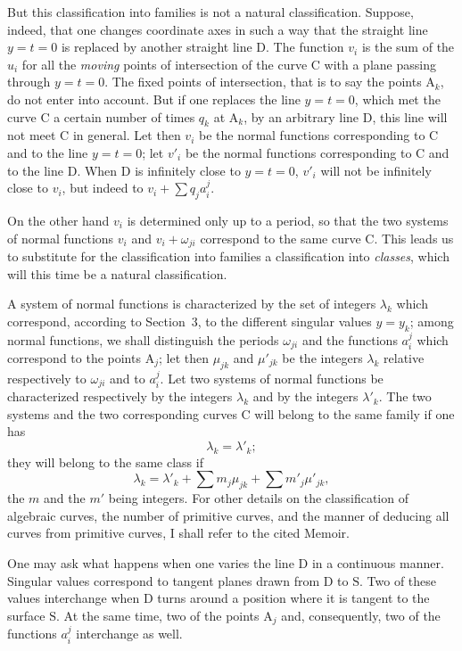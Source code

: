 \documentclass{article}
\begin{document}
But this classification into families is not a natural classification. Suppose, indeed, that one changes coordinate axes in such a way that the straight line $y = t = 0$ is replaced by another straight line $\mathrm{D}$. The function $v_{i}$ is the sum of the $u_{i}$ for all the \emph{moving} points of intersection of the curve $\mathrm{C}$ with a plane passing through $y = t = 0$. The fixed points of intersection, that is to say the points $\mathrm{A}_{k}$, do not enter into account. But if one replaces the line $y = t = 0$, which met the curve $\mathrm{C}$ a certain number of times $q_{k}$ at $\mathrm{A}_{k}$, by an arbitrary line $\mathrm{D}$, this line will not meet $\mathrm{C}$ in general. Let then $v_{i}$ be the normal functions corresponding to $\mathrm{C}$ and to the line $y = t = 0$;
let $v'_{i}$ be the normal functions corresponding to $\mathrm{C}$ and to the line $\mathrm{D}$. When $\mathrm{D}$ is infinitely close to $y = t = 0$, $v'_{i}$ will not be infinitely close to $v_{i}$, but indeed to $\displaystyle v_{i} + \sum q_{j} a_{i}^{j}$.

On the other hand $v_{i}$ is determined only up to a period, so that the two systems of normal functions $v_{i}$ and $v_{i} + \omega_{ji}$ correspond to the same curve $\mathrm{C}$. This leads us to substitute for the classification into families a classification into \emph{classes}, which will this time be a natural classification.

A system of normal functions is characterized by the set of integers $\lambda_{k}$ which correspond, according to Section~3, to the different singular values $y = y_{k}$; among normal functions, we shall distinguish the periods $\omega_{ji}$ and the functions $a_{i}^{j}$ which correspond to the points $\mathrm{A}_{j}$; let then $\mu_{jk}$ and $\mu'_{jk}$ be the integers $\lambda_{k}$ relative respectively to $\omega_{ji}$ and to $a_{i}^{j}$. Let two systems of normal functions be characterized respectively by the integers $\lambda_{k}$ and by the integers $\lambda'_{k}$. The two systems and the two corresponding curves $\mathrm{C}$ will belong to the same family if one has
\[
\lambda_{k} = \lambda'_{k};
\]
they will belong to the same class if
\[
\lambda_{k} = \lambda'_{k} + \sum m_{j} \mu_{jk} + \sum m'_{j} \mu'_{jk},
\]
the $m$ and the $m'$ being integers. For other details on the classification of algebraic curves, the number of primitive curves, and the manner of deducing all curves from primitive curves, I shall refer to the cited Memoir.

One may ask what happens when one varies the line $\mathrm{D}$ in a continuous manner. Singular values correspond to tangent planes drawn from $\mathrm{D}$ to $\mathrm{S}$. Two of these values interchange when $\mathrm{D}$ turns around a position where it is tangent to the surface $\mathrm{S}$. At the same time, two of the points $\mathrm{A}_{j}$ and, consequently, two of the functions $a_{i}^{j}$ interchange as well.
\end{document}
